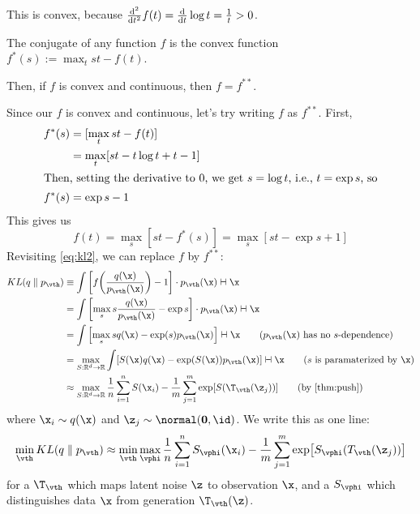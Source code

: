 \documentclass[class=cs480,notes,tikz]{agony}
\begin{document}
This is convex, because $\dv[2]{t} f(t) = \dv{t} \log t = \frac1t > 0$.

\begin{defn}
  The conjugate of any function $f$ is the convex function $f^*(s) := \max_t st - f(t)$.

  Then, if $f$ is convex and continuous, then $f = f^{**}$.
\end{defn}

Since our $f$ is convex and continuous, let's try writing $f$ as $f^{**}$. First,
\begin{align*}
  f^*(s) & = [\max_t st - f(t)]            \\
         & = \max_t [st - t\log t + t - 1] \\
  \intertext{Then, setting the derivative to 0, we get $s = \log t$, i.e., $t = \exp s$, so}
  f^*(s) & = \exp s - 1
\end{align*}
This gives us
\[ f(t) = \max_s [st - f^*(s)] = \max_s [st - \exp s + 1] \]
Revisiting \cref{eq:kl2}, we can replace $f$ by $f^{**}$:
\begin{align*}
  KL(q \parallel p_{\vth})
   & \equiv \int \qty[f\qty(\frac{q(\x)}{p_{\vth}(\x)})-1]\cdot p_{\vth}(\x) \dd{\x}                                                     \\
   & = \int \qty[\max_s s\frac{q(\x)}{p_{\vth}(\x)} - \exp s] \cdot p_{\vth}(\x) \dd{\x}                                                 \\
   & = \int \qty[\max_s sq(\x) - \exp(s)p_{\vth}(\x)] \dd{\x} \tag{$p_{\vth}(\x)$ has no $s$-dependence}                                 \\
   & = \max_{S : \R^d \to \R} \int [S(\x)q(\x) - \exp(S(\x))p_{\vth}(\x)] \dd{\x} \tag{$s$ is paramaterized by $\x$}                     \\
   & \approx \max_{S : \R^d \to \R} \frac1n\sum_{i=1}^n S(\x_i) - \frac1m \sum_{j=1}^m \exp[S(\T_{\vth}(\z_j))] \tag{by \cref{thm:push}}
\end{align*}
where $\x_i \sim q(\x)$ and $\z_j \sim \normal(\vb 0, \id)$.
We write this as one line:
\begin{equation}
  \min_{\vth} KL(q \parallel p_{\vth})
  \approx \min_{\vth} \max_{\vphi} \frac1n\sum_{i=1}^n S_{\vphi}(\x_i) - \frac1m \sum_{j=1}^m \exp[S_{\vphi}(T_{\vth}(\z_j))]
\end{equation}
for a  $\T_{\vth}$ which maps latent noise $\z$ to observation $\x$,
and a  $S_{\vphi}$ which distinguishes data $\x$ from generation $\T_{\vth}(\z)$.
\end{document}
